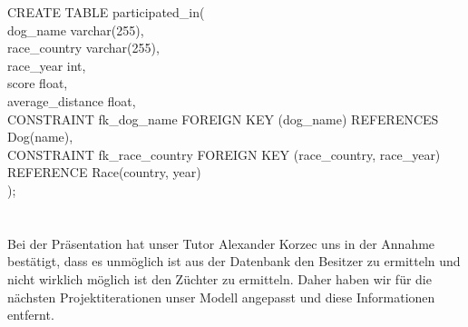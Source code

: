 \documentclass[10pt,a4paper]{article}
\begin{document}
{			CREATE TABLE participated\_in(\\
				\hspace*{4mm}	dog\_name varchar(255),\\
				\hspace*{4mm}	race\_country varchar(255),\\
				\hspace*{4mm}	race\_year int,\\
				\hspace*{4mm}	score float,\\
				\hspace*{4mm}	average\_distance float,\\
				\hspace*{4mm}	CONSTRAINT fk\_dog\_name FOREIGN KEY (dog\_name) REFERENCES Dog(name),\\
				\hspace*{4mm}	CONSTRAINT fk\_race\_country FOREIGN KEY (race\_country, race\_year) \\
				\hspace*{4mm}	REFERENCE Race(country, year)	\\
		);\\}\\ \\
		Bei der Präsentation hat unser Tutor Alexander Korzec uns in der Annahme bestätigt, dass es unmöglich ist aus der Datenbank den Besitzer zu ermitteln und nicht wirklich möglich ist den Züchter zu ermitteln. Daher haben wir für die nächsten Projektiterationen unser Modell angepasst und diese Informationen entfernt.
		\newpage
\end{document}
